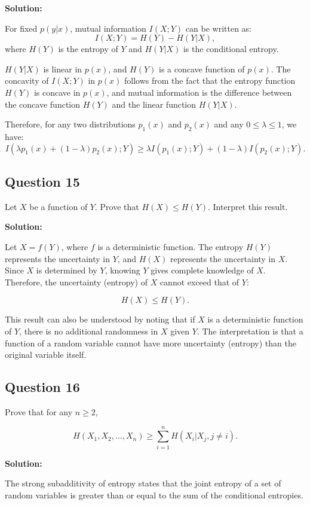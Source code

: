 \documentclass[a4paper,10pt]{article}
\begin{document}
\textbf{Solution:}

For fixed $ p(y|x) $, mutual information $ I(X;Y) $ can be written as:
$$
I(X;Y) = H(Y) - H(Y|X),
$$
where $ H(Y) $ is the entropy of $ Y $ and $ H(Y|X) $ is the conditional entropy.

$ H(Y|X) $ is linear in $ p(x) $, and $ H(Y) $ is a concave function of $ p(x) $. The concavity of $ I(X;Y) $ in $ p(x) $ follows from the fact that the entropy function $ H(Y) $ is concave in $ p(x) $, and mutual information is the difference between the concave function $ H(Y) $ and the linear function $ H(Y|X) $.

Therefore, for any two distributions $ p_1(x) $ and $ p_2(x) $ and any $ 0 \leq \lambda \leq 1 $, we have:
$$
I(\lambda p_1(x) + (1-\lambda)p_2(x); Y) \geq \lambda I(p_1(x); Y) + (1-\lambda)I(p_2(x); Y).
$$

\subsection*{Question 15}

Let $ X $ be a function of $ Y $. Prove that $ H(X) \leq H(Y) $. Interpret this result.

\textbf{Solution:}

Let $ X = f(Y) $, where $ f $ is a deterministic function. The entropy $ H(Y) $ represents the uncertainty in $ Y $, and $ H(X) $ represents the uncertainty in $ X $. Since $ X $ is determined by $ Y $, knowing $ Y $ gives complete knowledge of $ X $. Therefore, the uncertainty (entropy) of $ X $ cannot exceed that of $ Y $:

$$
H(X) \leq H(Y).
$$

This result can also be understood by noting that if $ X $ is a deterministic function of $ Y $, there is no additional randomness in $ X $ given $ Y $. The interpretation is that a function of a random variable cannot have more uncertainty (entropy) than the original variable itself.

\subsection*{Question 16}

Prove that for any $ n \geq 2 $,

$$
H(X_1, X_2, \dots, X_n) \geq \sum_{i=1}^{n} H(X_i | X_j, j \neq i).
$$

\textbf{Solution:}

The strong subadditivity of entropy states that the joint entropy of a set of random variables is greater than or equal to the sum of the conditional entropies. 
\end{document}
